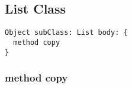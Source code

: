 \subsection{List Class}

\begin{lstlisting}
Object subClass: List body: {
  method copy
}
\end{lstlisting}

\subsubsection{method copy}
